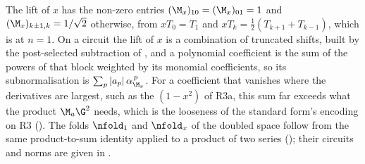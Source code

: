 The lift of $x$ has the non-zero entries $(\M_x)_{10}=(\M_x)_{01}=1$ and $(\M_x)_{k\pm1,k}=1/\sqrt2$ otherwise, from $xT_0=T_1$ and $xT_k=\tfrac12(T_{k+1}+T_{k-1})$, which is  at $n=1$. On a circuit the lift of $x$ is a combination of truncated shifts, built by the post-selected subtraction of , and a polynomial coefficient is the sum of the powers of that block weighted by its monomial coefficients, so its subnormalisation is $\sum_p|a_p|\,\alpha_{\M_x}^{\,p}$. For a coefficient that vanishes where the derivatives are largest, such as the $(1-x^2)$ of R3a, this sum far exceeds what the product $\M_a\G^2$ needs, which is the looseness of the standard form's encoding on R3 (). The folds $\nfold_1$ and $\nfold_x$ of the doubled space follow from the same product-to-sum identity applied to a product of two series (); their circuits and norms are given in .
